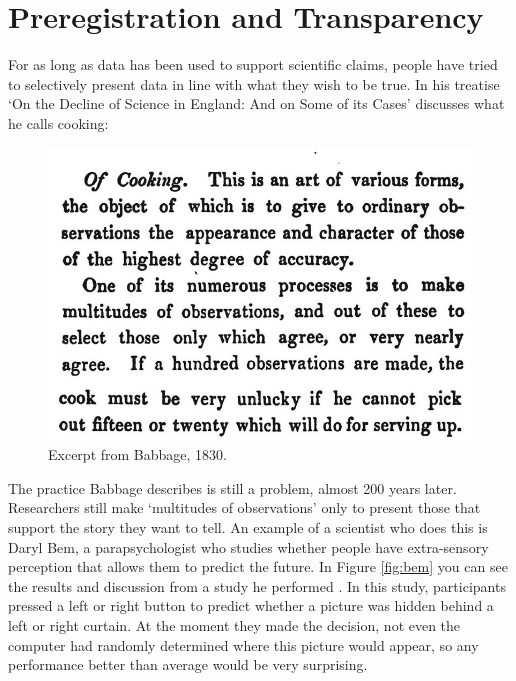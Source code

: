 \documentclass[
  oneside]{krantz}
\begin{document}
\hypertarget{prereg}{%
\chapter{Preregistration and Transparency}\label{prereg}}

For as long as data has been used to support scientific claims, people have tried to selectively present data in line with what they wish to be true. In his treatise `On the Decline of Science in England: And on Some of its Cases' \citet{babbage_reflections_1830} discusses what he calls cooking:



\begin{figure}

{\centering \includegraphics[width=1\linewidth]{images/babbage} 

}

\caption{Excerpt from Babbage, 1830.}\label{fig:babbage}
\end{figure}

The practice Babbage describes is still a problem, almost 200 years later. Researchers still make `multitudes of observations' only to present those that support the story they want to tell. An example of a scientist who does this is Daryl Bem, a parapsychologist who studies whether people have extra-sensory perception that allows them to predict the future. In Figure \ref{fig:bem} you can see the results and discussion from a study he performed \citep{bem_feeling_2011}. In this study, participants pressed a left or right button to predict whether a picture was hidden behind a left or right curtain. At the moment they made the decision, not even the computer had randomly determined where this picture would appear, so any performance better than average would be very surprising.
\end{document}

